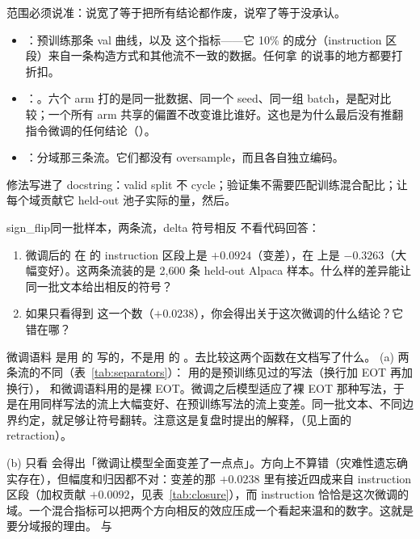 范围必须说准：说宽了等于把所有结论都作废，说窄了等于没承认。

\begin{itemize}\itemsep3pt
  \item {}：预训练那条 val 曲线，以及  这个指标——它 10\% 的成分（instruction 区段）来自一条构造方式和其他流不一致的数据。任何拿  的说事的地方都要打折扣。
  \item {}：。六个 arm 打的是同一批数据、同一个 seed、同一组 batch，是配对比较；一个所有 arm 共享的偏置不改变谁比谁好。这也是为什么最后没有推翻指令微调的任何结论（）。
  \item {}：分域那三条流。它们都没有 oversample，而且各自独立编码。
\end{itemize}

修法写进了 docstring：valid split 不 cycle；验证集不需要匹配训练混合配比；让每个域贡献它 held-out 池子实际的量，然后。

\begin{checkpoint}{sign_flip}{同一批样本，两条流，delta 符号相反}
不看代码回答：
\begin{enumerate}[label=(\alph*)]
  \item 微调后的  在  的 instruction 区段上是 $+0.0924$（变差），在  上是 $-0.3263$（大幅变好）。这两条流装的是 2{,}600 条 held-out Alpaca 样本。什么样的差异能让同一批文本给出相反的符号？
  \item 如果只看得到  这一个数（$+0.0238$），你会得出关于这次微调的什么结论？它错在哪？
\end{enumerate}
\hint 微调语料  是用  的  写的，不是用  的 。去比较这两个函数在文档写了什么。
\ifshowanswers
\tcblower
\answer (a) 两条流的不同（表~\ref{tab:separators}）： 用的是预训练见过的写法（换行加 EOT 再加换行）， 和微调语料用的是裸 EOT。微调之后模型适应了裸 EOT 那种写法，于是在用同样写法的流上大幅变好、在预训练写法的流上变差。同一批文本、不同边界约定，就足够让符号翻转。注意这是复盘时提出的解释，（见上面的 retraction）。

(b) 只看  会得出「微调让模型全面变差了一点点」。方向上不算错（灾难性遗忘确实存在），但幅度和归因都不对：变差的那 $+0.0238$ 里有接近四成来自 instruction 区段（加权贡献 $+0.0092$，见表~\ref{tab:closure}），而 instruction 恰恰是这次微调的域。一个混合指标可以把两个方向相反的效应压成一个看起来温和的数字。这就是要分域报的理由。
\whereincode {} 与 
\fi
\end{checkpoint}

